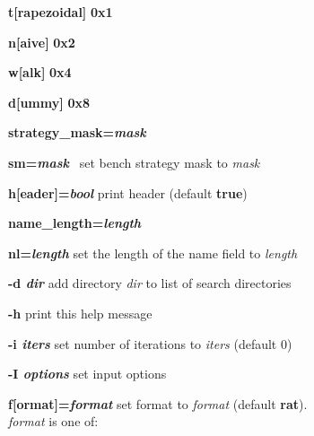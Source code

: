 \begin{list}{}
\begin{list}{}
\begin{list}{}
{	\setlength{\itemindent}{0pt}
	\setlength{\leftmargin}{0.2\textwidth}
	\setlength{\labelsep}{0pt}
	\setlength{\labelwidth}{0.2\textwidth}
	\settowidth{\listparindent}{abcdefg}
      }
    \item[\bf{t[rapezoidal]}\hfill] \bf{0x1}
    \item[\bf{n[aive]}\hfill]       \bf{0x2}
    \item[\bf{w[alk]}\hfill]        \bf{0x4}
    \item[\bf{d[ummy]}\hfill]       \bf{0x8}
    \end{list}
  \item[\bf{strategy\_mask={\em mask}}\hfill]
  \item[\bf{sm={\em mask}}\hfill]\
    set bench strategy mask to {\em mask}
  \item[\bf{h[eader]={\em bool}}\hfill]
    print header (default \textbf{true})
  \item[\bf{name\_length={\em length}}\hfill]
  \item[\bf{nl={\em length}}\hfill]
    set the length of the name field to {\em length}
  \end{list}
\item[\bf{-d {\em dir}}\hfill]
  add directory {\em dir} to list of search directories
\item[\bf{-h}\hfill]
  print this help message
\item[\bf{-i {\em iters}}\hfill]
  set number of iterations to {\em iters} (default 0)
\item[\bf{-I {\em options}}\hfill]
  set input options
  \begin{list}{}
    {
      \setlength{\topsep}{0pt}
      \setlength{\partopsep}{0pt}
      \setlength{\parskip}{0pt}
      \setlength{\parsep}{0pt}
      \setlength{\itemsep}{0pt}
      \setlength{\itemindent}{0pt}
      \setlength{\leftmargin}{0.2\textwidth}
      \setlength{\labelsep}{0pt}
      \setlength{\labelwidth}{0.2\textwidth}
      \settowidth{\listparindent}{abcdefg}
    }
    \item[\bf{f[ormat]={\em format}}\hfill]
      set format to {\em format} (default \textbf{rat}).\\
      {\em format} is one of:
      \begin{list}{}
	{
	  \setlength{\topsep}{0pt}
	  \setlength{\partopsep}{0pt}
	  \setlength{\parskip}{0pt}
	  \setlength{\parsep}{0pt}
	  \setlength{\itemsep}{0pt}
	  \setlength{\itemindent}{0pt}
	  \setlength{\leftmargin}{0.2\textwidth}
	  \setlength{\labelsep}{0pt}
	  \setlength{\labelwidth}{0.2\textwidth}
}
\end{list}
\end{list}
\end{list}
